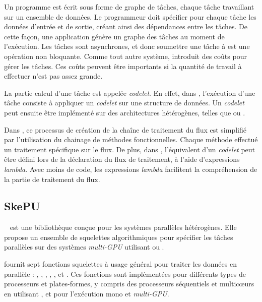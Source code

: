 Un programme  est \'ecrit sous forme de graphe de t\^aches, chaque t\^ache travaillant sur un ensemble de donn\'ees. Le programmeur doit sp\'ecifier pour chaque t\^ache les donn\'ees d'entr\'ee et de sortie, cr\'eant ainsi des d\'ependances entre les t\^aches. De cette fa\c{c}on, une application  g\'en\`ere un graphe des t\^aches au moment de l'ex\'ecution. Les t\^aches sont asynchrones, et donc soumettre une t\^ache \`a  est une op\'eration non bloquante. Comme tout autre syst\`eme,  introduit des co\^uts pour g\'erer les t\^aches. Ces co\^uts peuvent \^etre importants si la quantit\'e de travail \`a effectuer n'est pas assez grande.

La partie calcul d'une t\^ache est appel\'ee \emph{codelet}. En effet, dans , l'ex\'ecution d'une t\^ache consiste \`a appliquer un \emph{codelet} sur une structure de donn\'ees. Un \emph{codelet} peut ensuite \^etre impl\'ement\'e sur des architectures h\'et\'erog\`enes, telles que  ou .

Dans , ce processus de cr\'eation de la cha\^ine de traitement du flux est  simplifi\'e par l'utilisation du chainage de m\'ethodes fonctionnelles. Chaque m\'ethode effectu\'e un traitement sp\'ecifique sur le flux. De plus, dans , l'équivalent d'un \emph{codelet}  peut \^etre d\'efini lors de la d\'eclaration du flux de traitement, \`a l'aide d'expressions \emph{lambda}. Avec moins de code, les expressions \emph{lambda} facilitent la compr\'ehension de la partie de traitement du flux.




 


\subsection{SkePU} 

~\citep{skePuReferenceEnLigne} est une biblioth\`eque  con\c {c}ue pour les syst\`emes parall\`eles h\'et\'erog\`enes. Elle propose un ensemble de squelettes algorithmiques pour sp\'ecifier les t\^aches parall\`eles sur des syst\`emes \emph{multi-GPU} utilisant  ou .

 fournit sept fonctions squelettes \`a usage g\'en\'eral pour traiter les donn\'ees en parall\`ele : , , , , ,  et . Ces fonctions sont impl\'ementées pour diff\'erents types de processeurs et plates-formes, y compris des processeurs s\'equentiels et multicœurs en utilisant ,  et  pour l'ex\'ecution mono et \emph{multi-GPU}.

